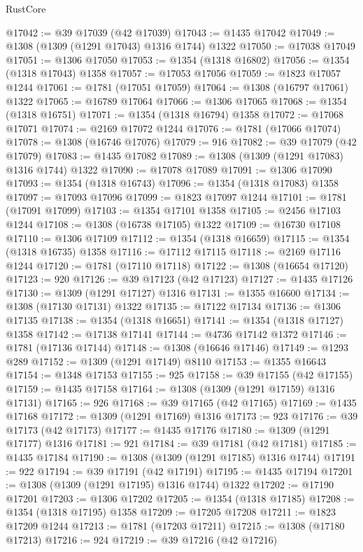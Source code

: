 \begin{lexlean}{RustCore}
\begin{coremodule}
@17042 := @39 @17039 (@42 @17039)
@17043 := @1435 @17042
@17049 := @1308 (@1309 (@1291 @17043) @1316 @1744) @1322
@17050 := @17038 @17049
@17051 := @1306 @17050
@17053 := @1354 (@1318 @16802)
@17056 := @1354 (@1318 @17043) @1358
@17057 := @17053 @17056
@17059 := @1823 @17057 @1244
@17061 := @1781 (@17051 @17059)
@17064 := @1308 (@16797 @17061) @1322
@17065 := @16789 @17064
@17066 := @1306 @17065
@17068 := @1354 (@1318 @16751)
@17071 := @1354 (@1318 @16794) @1358
@17072 := @17068 @17071
@17074 := @2169 @17072 @1244
@17076 := @1781 (@17066 @17074)
@17078 := @1308 (@16746 @17076)
@17079 := 916
@17082 := @39 @17079 (@42 @17079)
@17083 := @1435 @17082
@17089 := @1308 (@1309 (@1291 @17083) @1316 @1744) @1322
@17090 := @17078 @17089
@17091 := @1306 @17090
@17093 := @1354 (@1318 @16743)
@17096 := @1354 (@1318 @17083) @1358
@17097 := @17093 @17096
@17099 := @1823 @17097 @1244
@17101 := @1781 (@17091 @17099)
@17103 := @1354 @17101 @1358
@17105 := @2456 @17103 @1244
@17108 := @1308 (@16738 @17105) @1322
@17109 := @16730 @17108
@17110 := @1306 @17109
@17112 := @1354 (@1318 @16659)
@17115 := @1354 (@1318 @16735) @1358
@17116 := @17112 @17115
@17118 := @2169 @17116 @1244
@17120 := @1781 (@17110 @17118)
@17122 := @1308 (@16654 @17120)
@17123 := 920
@17126 := @39 @17123 (@42 @17123)
@17127 := @1435 @17126
@17130 := @1309 (@1291 @17127) @1316
@17131 := @1355 @16600
@17134 := @1308 (@17130 @17131) @1322
@17135 := @17122 @17134
@17136 := @1306 @17135
@17138 := @1354 (@1318 @16651)
@17141 := @1354 (@1318 @17127) @1358
@17142 := @17138 @17141
@17144 := @4736 @17142 @1372
@17146 := @1781 (@17136 @17144)
@17148 := @1308 (@16646 @17146)
@17149 := @1293 @289
@17152 := @1309 (@1291 @17149) @8110
@17153 := @1355 @16643
@17154 := @1348 @17153
@17155 := 925
@17158 := @39 @17155 (@42 @17155)
@17159 := @1435 @17158
@17164 := @1308 (@1309 (@1291 @17159) @1316 @17131)
@17165 := 926
@17168 := @39 @17165 (@42 @17165)
@17169 := @1435 @17168
@17172 := @1309 (@1291 @17169) @1316
@17173 := 923
@17176 := @39 @17173 (@42 @17173)
@17177 := @1435 @17176
@17180 := @1309 (@1291 @17177) @1316
@17181 := 921
@17184 := @39 @17181 (@42 @17181)
@17185 := @1435 @17184
@17190 := @1308 (@1309 (@1291 @17185) @1316 @1744)
@17191 := 922
@17194 := @39 @17191 (@42 @17191)
@17195 := @1435 @17194
@17201 := @1308 (@1309 (@1291 @17195) @1316 @1744) @1322
@17202 := @17190 @17201
@17203 := @1306 @17202
@17205 := @1354 (@1318 @17185)
@17208 := @1354 (@1318 @17195) @1358
@17209 := @17205 @17208
@17211 := @1823 @17209 @1244
@17213 := @1781 (@17203 @17211)
@17215 := @1308 (@17180 @17213)
@17216 := 924
@17219 := @39 @17216 (@42 @17216)

\end{coremodule}
\end{lexlean}
